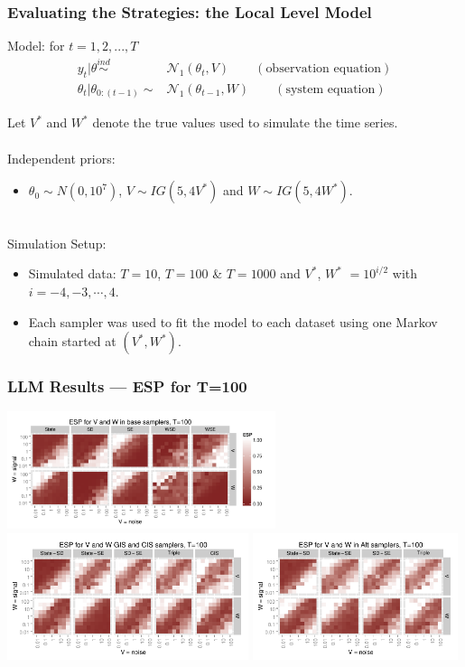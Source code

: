 \documentclass[xcolor=dvipsnames]{beamer}
\newcommand\N{\mathcal{N}}
\begin{document}
\begin{frame}[fragile]
\frametitle{Evaluating the Strategies: the Local Level Model}
Model: for $t=1,2,...,T$
\begin{align*}
    y_t|\theta  \stackrel{ind}{\sim}&\N_1(\theta_t,V) \qquad (\mbox{observation equation})\\
    \theta_t|\theta_{0:(t-1)} \sim& \N_1(\theta_{t-1},W) \qquad (\mbox{system equation})
  \end{align*} 

Let $V^*$ and $W^*$ denote the true values used to simulate the time series.\\~\\

Independent priors:
\begin{itemize}
\item $\theta_0\sim N(0, 10^7)$, $V\sim IG(5, 4V^*)$ and $W\sim IG(5, 4W^*)$.\\~\\
\end{itemize}

Simulation Setup:
\begin{itemize}
\item Simulated data: $T=10$, $T=100$ \& $T=1000$ and $V^*$, $W^*$ $=10^{i/2}$ with $i=-4,-3,\cdots,4$.
\item Each sampler was used to fit the model to each dataset using one Markov chain started at $(V^*,W^*)$.
\end{itemize}


\end{frame}

\begin{frame}
\frametitle{LLM Results --- ESP for T=100}
\centering
\includegraphics[width=0.59\textwidth]{basecisESplot100}\\
\includegraphics[width=0.53\textwidth]{altintESplotV100}
\includegraphics[width=0.45\textwidth]{altintESplotW100}
\end{frame}
\end{document}
